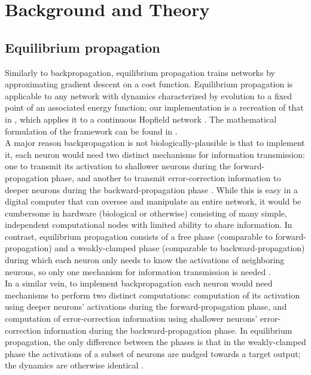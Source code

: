 \documentclass[format=sigconf]{acmart}
\newcommand{\npar}{\\\indent}
\begin{document}
\section{Background and Theory}

\subsection{Equilibrium propagation}
\label{sec:eqp_formulation}

Similarly to backpropagation, equilibrium propagation \cite{scellier17} trains networks by approximating gradient descent on a cost function. Equilibrium propagation is applicable to any network with dynamics characterized by evolution to a fixed point of an associated energy function; our implementation is a recreation of that in \cite{scellier17}, which applies it to a continuous Hopfield network \cite{hopfield1984}. The mathematical formulation of the framework can be found in \cite{scellier17}.
\npar
A major reason backpropagation is not biologically-plausible is that to implement it, each neuron would need two distinct mechanisms for information transmission: one to transmit its activation to shallower neurons during the forward-propagation phase, and another to transmit error-correction information to deeper neurons during the backward-propagation phase \cite{bengio2015}. While this is easy in a digital computer that can oversee and manipulate an entire network, it would be cumbersome in hardware (biological or otherwise) consisting of many simple, independent computational nodes with limited ability to share information. In contrast, equilibrium propagation consists of a free phase (comparable to forward-propagation) and a weakly-clamped phase (comparable to backward-propagation) during which each neuron only needs to know the activations of neighboring neurons, so only one mechanism for information transmission is needed \cite{scellier17}.
\npar
In a similar vein, to implement backpropagation each neuron would need mechanisms to perform two distinct computations: computation of its activation using deeper neurons' activations during the forward-propagation phase, and computation of error-correction information using shallower neurons' error-correction information during the backward-propagation phase. In equilibrium propagation, the only difference between the phases is that in the weakly-clamped phase the activations of a subset of neurons are nudged towards a target output; the dynamics are otherwise identical \cite{scellier17}.
\end{document}
